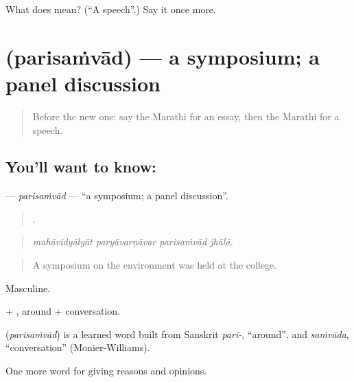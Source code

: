 \begin{tcolorbox}[breakable,colback=teal!4,colframe=teal!35!black,title={Before you move on}]
What does  mean? (\textquotedblleft{}A speech\textquotedblright{}.) Say it once more.
\end{tcolorbox}
\section[\texorpdfstring{\mr{परिसंवाद} (parisaṁvād)}{परिसंवाद (parisaṁvād)}]{ (parisaṁvād) — a symposium; a panel discussion}

\label{lesson:MR-C370-parisamvad}



\begin{quote}
Before the new one: say the Marathi for an essay, then the Marathi for a speech.
\end{quote}

\subsection*{You'll want to know: }
\textbf{} — \emph{parisaṁvād} — \textquotedblleft{}a symposium; a panel discussion\textquotedblright{}.

\begin{quote}
   .
\end{quote}

\begin{quote}
\emph{mahāvidyālyāt paryāvarṇāvar parisaṁvād jhālā.}
\end{quote}

\begin{quote}
A symposium on the environment was held at the college.
\end{quote}

Masculine.

 + , around + conversation.

\begin{cousinweb}
\textbf{} (\emph{parisaṁvād}) is a learned word built from Sanskrit \emph{pari-}, \textquotedblleft{}around\textquotedblright{}, and \emph{saṁvāda}, \textquotedblleft{}conversation\textquotedblright{} (Monier-Williams).
\end{cousinweb}

\begin{grammarlens}[title={What you've built}]
One more word for giving reasons and opinions.
\end{grammarlens}

